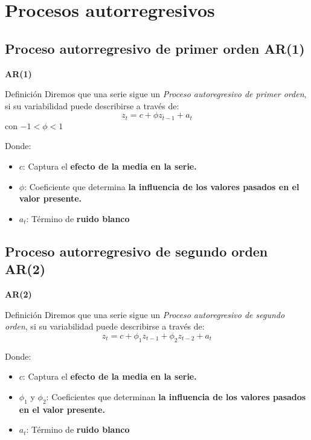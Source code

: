 \documentclass[11pt]{beamer}
\begin{document}
\section{Procesos autorregresivos}
\begin{frame} 
\tableofcontents[currentsection] %
\end{frame}

\subsection{Proceso autorregresivo de primer orden AR(1)}
\begin{frame}{\textbf{AR(1)}}
\begin{block}{Definición}
Diremos que una serie sigue un \textit{Proceso autoregresivo de primer orden}, si su variabilidad puede describirse a través de: 
\begin{equation}
	z_t = c + \phi z_{t-1} + a_t
\end{equation}
con $-1 < \phi < 1$
\end{block}

\begin{block}{Donde:}
\begin{itemize}
	\item $c$: Captura el \textbf{efecto de la media en la serie.}
	\item $\phi$: Coeficiente que determina \textbf{la influencia de los valores pasados en el valor presente.}
	\item $a_t$: Término de \textbf{ruido blanco}
\end{itemize}
\end{block}
\end{frame}

\subsection{Proceso autorregresivo de segundo orden AR(2)}
\begin{frame}{\textbf{AR(2)}}
\begin{block}{Definición}
Diremos que una serie sigue un \textit{Proceso autoregresivo de segundo orden}, si su variabilidad puede describirse a través de: 
\begin{equation}
	z_t = c + \phi_1 z_{t-1} + \phi_2 z_{t-2} + a_t
\end{equation}
\end{block}

\begin{block}{Donde:}
\begin{itemize}
	\item $c$: Captura el \textbf{efecto de la media en la serie.}
	\item $\phi_1$ y $\phi_2$: Coeficientes que determinan \textbf{la influencia de los valores pasados en el valor presente.}
	\item $a_t$: Término de \textbf{ruido blanco}
\end{itemize}
\end{block}
\end{frame}
\end{document}
